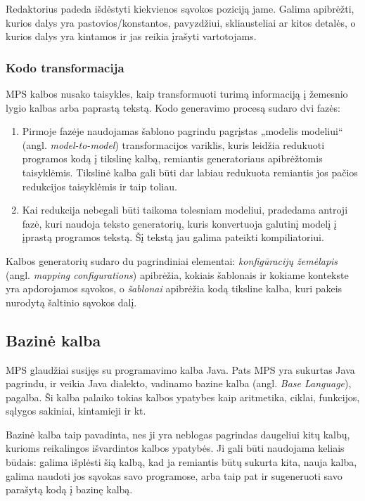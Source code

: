 \documentclass{VUMIFPSkursinis}
\begin{document}
Redaktorius padeda išdėstyti kiekvienos sąvokos poziciją jame. Galima apibrėžti, kurios dalys yra pastovios/konstantos, pavyzdžiui, skliausteliai ar kitos detalės, o kurios dalys yra kintamos ir jas reikia įrašyti vartotojams.

\subsubsection{Kodo transformacija}
MPS kalbos nusako taisykles, kaip transformuoti turimą informaciją į žemesnio lygio kalbas arba paprastą tekstą. Kodo generavimo procesą sudaro dvi fazės:
\begin{enumerate}
\item Pirmoje fazėje naudojamas šablono pagrindu pagrįstas „modelis modeliui“ (angl. \textit{model-to-model}) transformacijos variklis, kuris leidžia redukuoti programos kodą į tikslinę kalbą, remiantis generatoriaus apibrėžtomis taisyklėmis. Tikslinė kalba gali būti dar labiau redukuota remiantis jos pačios redukcijos taisyklėmis ir taip toliau.
\item Kai redukcija nebegali būti taikoma tolesniam modeliui, pradedama antroji fazė, kuri naudoja teksto generatorių, kuris konvertuoja galutinį modelį į įprastą programos tekstą. Šį tekstą jau galima pateikti kompiliatoriui. \cite{10.1145/2500828.2500846}
\end{enumerate}


Kalbos generatorių sudaro du pagrindiniai elementai: \textit{konfigūracijų žemėlapis} (angl. \textit{mapping configurations}) apibrėžia, kokiais šablonais ir kokiame kontekste yra apdorojamos sąvokos, o \textit{šablonai} apibrėžia kodą tiksline kalba, kuri pakeis nurodytą šaltinio sąvokos dalį.

\subsection{Bazinė kalba}
MPS glaudžiai susijęs su programavimo kalba Java. Pats MPS yra sukurtas Java pagrindu, ir veikia Java dialekto, vadinamo bazine kalba (angl. \textit{Base Language}), pagalba. Ši kalba palaiko tokias kalbos ypatybes kaip aritmetika, ciklai, funkcijos, sąlygos sakiniai, kintamieji ir kt.

Bazinė kalba taip pavadinta, nes ji yra neblogas pagrindas daugeliui kitų kalbų, kurioms reikalingos išvardintos kalbos ypatybės. Ji gali būti naudojama keliais būdais: galima išplėsti šią kalbą, kad ja remiantis būtų sukurta kita, nauja kalba, galima naudoti jos sąvokas savo programose, arba taip pat ir sugeneruoti savo parašytą kodą į bazinę kalbą.
\end{document}

